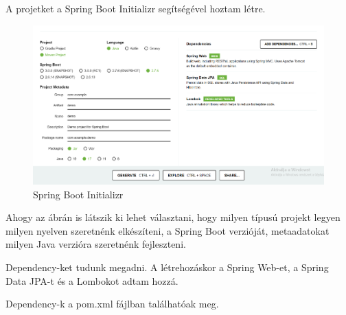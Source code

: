 

A projetket a Spring Boot Initializr segítségével hoztam létre.

\begin{figure}[h]
\centering
\includegraphics[scale=0.37]{images/Spring_init.png}
\caption{Spring Boot Initializr\cite{SpringInit}}
\label{fig:Spring_Boot_Initializr}
\end{figure}

Ahogy az ábrán is látszik ki lehet választani, hogy milyen típusú projekt legyen milyen nyelven szeretnénk elkészíteni, a Spring Boot verzióját, metaadatokat milyen Java verzióra szeretnénk fejleszteni.

Dependency-ket tudunk megadni. A létrehozáskor a Spring Web-et, a Spring Data JPA-t és a Lombokot adtam hozzá.

Dependency-k a pom.xml fájlban találhatóak meg. 

